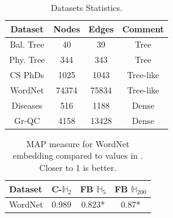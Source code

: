 

\begin{table}\centering
\begin{tabular}{|c||c|c|c|}\hline
  Dataset & Nodes & Edges & Comment\\
  \hline Bal. Tree & 40 & 39 & Tree\\
  Phy. Tree & 344 & 343 & Tree\\
  \hline\hline CS PhDs & 1025 & 1043 & Tree-like\\
  WordNet & 74374 & 75834 & Tree-like\\
  \hline\hline Diseases & 516 & 1188 & Dense\\
 Gr-QC & 4158 &  13428& Dense\\
  \hline
\end{tabular}
\caption{Datasets Statistics.}
\end{table}

\begin{table}[h]
\centering
\begin{tabular}{|l||c|c|c|} \hline
Dataset     	          &  C-$\mathbb{H}_2$ &  FB $\mathbb{H}_5$ & FB $\mathbb{H}_{200}$                  \\ \hline\hline
WordNet & 0.989 & 0.823* & 0.87*\\
  \hline
\end{tabular}
\caption{MAP measure for WordNet embedding compared to values in \citet{fb}. Closer to 1 is better.}
\label{table:wordnet_results}
\end{table}

